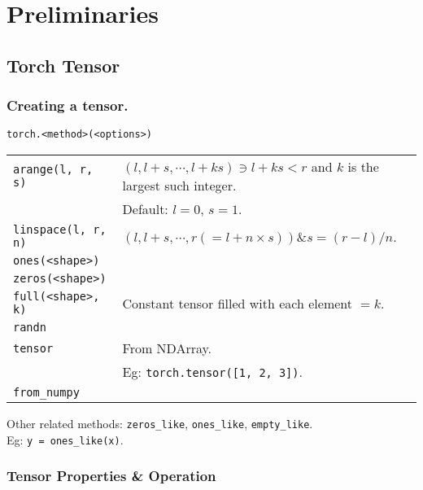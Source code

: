 \section{Preliminaries}

\subsection{Torch Tensor}

\subsubsection*{Creating a tensor.}
\texttt{torch.<method>(<options>)}\\
\begin{tabularx}{\linewidth}{lX}
    \hline
    \texttt{arange(l, r, s)}        & $(l, l+s, \cdots, l+ks) \ni l+ks < r$ and $k$ is the largest such integer.\\
                                    & Default: $l = 0$, $s = 1$.\\ 
    \texttt{linspace(l, r, n)}      & $(l, l+s, \cdots, r(= l + n\times s)) \& s = (r-l)/n$.\\
    \texttt{ones(<shape>)}          & \\ 
    \texttt{zeros(<shape>)}         & \\ 
    \texttt{full(<shape>, k)}       & Constant tensor filled with each element $= k$.\\ 
    \texttt{randn}                  & \\
    \hline
    \texttt{tensor}                 & From NDArray.\\
                                    & Eg: \texttt{torch.tensor([1, 2, 3])}.\\
    \texttt{from\_numpy}            & \\
    \hline
\end{tabularx}

Other related methods: \texttt{zeros\_like}, \texttt{ones\_like}, \texttt{empty\_like}.\\
Eg: \texttt{y = ones\_like(x)}.\\

\subsubsection{Tensor Properties \& Operation}

